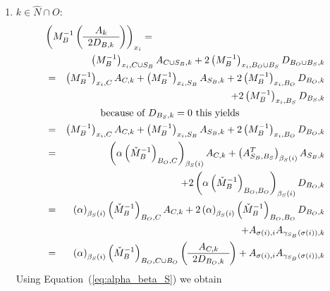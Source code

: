 \documentclass[a4paper]{article}
\begin{document}
\begin{enumerate}
\item $k \in \hat{N} \cap O$:
\begin{eqnarray}
\lefteqn{\left(M_{B}^{-1}
           \left(\begin{array}{c}
                   A_{k} \\
	           \hline
	           2D_{B, k}
	         \end{array}
           \right)
         \right)_{x_{i}}
=} \nonumber \\
&&
\left(M_{B}^{-1}\right)_{x_{i}, C \cup S_{B}}A_{C \cup S_{B}, k}
+2\left(M_{B}^{-1}\right)_{x_{i}, B_{O} \cup B_{S}}D_{B_{O} \cup B_{S}, k}
\nonumber \\
&=&
\left(M_{B}^{-1}\right)_{x_{i}, C}A_{C, k}
+\left(M_{B}^{-1}\right)_{x_{i}, S_{B}}A_{S_{B}, k}
+2\left(M_{B}^{-1}\right)_{x_{i}, B_{O}}D_{B_{O}, k}
\nonumber \\
&&
+2\left(M_{B}^{-1}\right)_{x_{i}, B_{S}}D_{B_{S}, k}
\nonumber \\
&&\begin{minipage}{8cm}
because of $D_{B_{S}, k}=0$ this yields
\end{minipage}
\nonumber \\
&=&
\left(M_{B}^{-1}\right)_{x_{i}, C}A_{C, k}
+\left(M_{B}^{-1}\right)_{x_{i}, S_{B}}A_{S_{B}, k}
+2\left(M_{B}^{-1}\right)_{x_{i}, B_{O}}D_{B_{O}, k}
\nonumber \\
&=&
\left(\alpha\left(\check{M}_{B}^{-1}\right)_{B_{O}, C}\right)_{\beta_{S}(i)}
  A_{C, k}
+\left(A_{S_{B}, B_{S}}^{T}\right)_{\beta_{S}(i)}A_{S_{B},k}
\nonumber \\
&&
+2\left(\alpha\left(\check{M}_{B}^{-1}\right)_{B_{O}, B_{O}}\right)_{
  \beta_{S}(i)}D_{B_{O},k}
\nonumber \\
&=&
\left(\alpha\right)_{\beta_{S}(i)}\left(\check{M}_{B}^{-1}\right)_{B_{O}, C}
  A_{C, k}
+2\left(\alpha\right)_{\beta_{S}(i)}\left(\check{M}_{B}^{-1}\right)_{B_{O},
  B_{O}}D_{B_{O}, k}
\nonumber \\
&&
+A_{\sigma(i), i}A_{\gamma_{S_{B}}(\sigma(i)), k}
\nonumber \\
&=&
\left(\alpha\right)_{\beta_{S}(i)}\left(\check{M}_{B}^{-1}\right)_{B_{O},
  C \cup B_{O}}
\left(\begin{array}{c}
        A_{C,k} \\
	\hline
	2D_{B_{O},k}
       \end{array}
\right)
+A_{\sigma(i), i}A_{\gamma_{S_{B}}(\sigma(i)), k}
\nonumber
\end{eqnarray}
Using Equation~(\ref{eq:alpha_beta_S}) we obtain

\end{enumerate}
\end{document}
